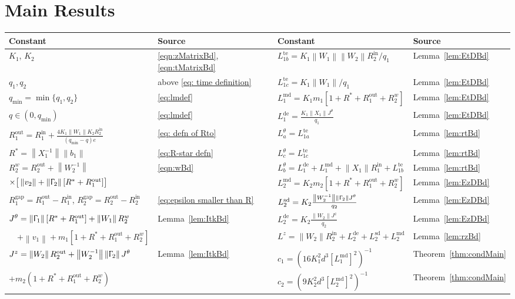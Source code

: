 \documentclass[usenames,dvipsnames,final,12pt]{colt2018} %
\newcommand{\bt}{b_1}
\newcommand{\vt}{v_1}
\newcommand{\Xt}{X_1}
\newcommand{\Wt}{W_1}
\newcommand{\Tt}{\Upgamma_1}
\newcommand{\mt}{m_1}
\newcommand{\lt}{q_1}
\newcommand{\etg}{R_1^{\textrm{gap}}}
\newcommand{\Rto}{R_1^\textrm{out}}
\newcommand{\Rti}{R_1^{\textrm{in}}}
\newcommand{\Kt}{K_1}
\newcommand{\LtD}{L_1^{\dt}}
\newcommand{\LtM}{L_1^{\md}}
\newcommand{\LtT}[1]{L_{1 #1}^{\te}}
\newcommand{\Lt}[1]{L^{\theta}_{#1}}
\newcommand{\vw}{v_2}
\newcommand{\Tw}{\Upgamma_2}
\newcommand{\Ww}{W_2}
\newcommand{\mw}{m_2}
\newcommand{\lz}{q_2}
\newcommand{\ezg}{R_2^{\textrm{gap}}}
\newcommand{\Rwo}{R_2^w}
\newcommand{\Rzo}{R_2^{\textrm{out}}}
\newcommand{\Rzi}{R_2^{\textrm{in}}}
\newcommand{\Lz}{L^z}
\newcommand{\LzD}{L_2^{\dt}}
\newcommand{\LzM}{L_2^{\md}}
\newcommand{\LzS}{L_2^{\sd}}
\newcommand{\Kz}{K_2}
\newcommand{\lmin}{q_{\min}}
\newcommand{\lm}{q}
\newcommand{\dt}{\text{de}}
\newcommand{\md}{\text{md}}
\newcommand{\sd}{\text{sd}}
\newcommand{\te}{\text{te}}
\newcommand{\norm}[1]{\left\lVert#1\right\rVert}
\newcommand{\Rw}{R_2^w}
\newcommand{\Rs}{R^*}
\newcommand{\Jt}{J^\theta}
\newcommand{\Jz}{J^z}
\newcommand{\gal}[1]{#1}
\begin{document}
\section{Main Results}


\begin{table}[t]
{\small
\begin{tabular}{l|l||l|l}
\hline
\gal{Constant}& \gal{Source}
&
\gal{Constant}& \gal{Source}
\\
\hline
$\Kt$, $\Kz$ & \eqref{eqn:zMatrixBd}, \eqref{eqn:tMatrixBd}
&
$\LtT{b} = \Kt \norm{\Wt}\norm{\Ww} \Rzi/ \lt$& Lemma~\ref{lem:EtDBd}
\\
$\lt, \lz$ & above \eqref{eq: time definition}
&
$\LtT{c} = \Kt \norm{\Wt} /\lt$& Lemma~\ref{lem:EtDBd}
\\
$\lmin=\min\{\lt,\lz\}$& \eqref{eq:lmdef}
&
$\LtM = \Kt \mt[1 + \Rs + \Rto + \Rw]$& Lemma~\ref{lem:EtDBd}
\\
$\lm \in (0, \lmin)$ & \eqref{eq:lmdef}
&
$\LtD = \frac{\Kt \norm{\Xt} \Jt}{\lt}$& Lemma~\ref{lem:EtDBd}
\\
$\Rto = \Rti + \frac{4\Kt \norm{\Wt} \Kz \Rzi}{(\lmin-\lm)e}$ & {\eqref{eq: defn of Rto}} %
&
$\Lt{a} = \LtT{a}$& Lemma~\ref{lem:rtBd}
\\
$\Rs = \norm{\Xt^{-1}} \norm{\bt}$ & {\eqref{eq:R-star defn}}
&
$\Lt{c} = \LtT{c}$& Lemma~\ref{lem:rtBd}
\\
$\Rwo =\Rzo + \norm{\Ww^{-1}}$ & \eqref{eqn:wBd}
&
$\Lt{b} = \LtD + \LtM +  \norm{\Xt} \Rti + \LtT{b}$& Lemma~\ref{lem:rtBd}
\\
\hfill$\times \big[\norm{\vw} + \norm{\Tw}[\Rs + \Rto] \big]$&
&
$\LzM = \Kz\mw[1 + \Rs + \Rto + \Rw]$& Lemma~\ref{lem:EzDBd}
\\
$\etg = \Rto-\Rti$, {$\ezg = \Rzo-\Rzi$} & {\eqref{eq:epsilon smaller than R}}
&
$\LzS = \Kz\frac{\norm{\Ww^{-1}}\norm{\Tw}\Jt}{\lz}$& Lemma~\ref{lem:EzDBd}
\\
$\Jt = \norm{\Tt}[ \Rs  + \Rto] + \norm{\Wt} \Rw$
& Lemma~\ref{lem:ItkBd}
&
{$\LzD = \Kz\frac{\norm{\Ww}\Jz}{ \lz}$}& {Lemma~\ref{lem:EzDBd}}
\\
~~\hfill$+ \norm{\vt}  + \mt [1 + \Rs + \Rto + \Rw]$ &
&
$\Lz= \norm{\Ww} \Rzi + \LzD + \LzS + \LzM$& Lemma~\ref{lem:rzBd}
\\
$\Jz = \norm{\Ww} \Rzo  +  \norm{\Ww^{-1}} \norm{\Tw}\Jt$
& Lemma~\ref{lem:ItkBd}
&
\gal{$c_1 = (16 \Kt^2 d^3 [\LtM]^2 )^{-1}$} & Theorem~\ref{thm:condMain}
\\
\hfill$+ \mw(1 + \Rs + \Rto + \Rw)$ &
&
\gal{$c_2 = (9 \Kz^2 d^3 [\LzM]^2)^{-1}$} & Theorem~\ref{thm:condMain}

\end{tabular}}
\end{table}
\end{document}
